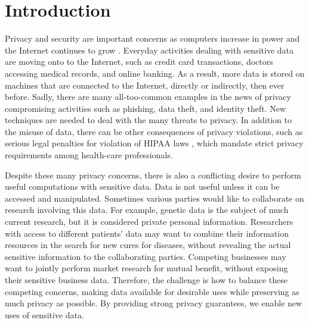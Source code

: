 
\chapter{Introduction}
\begin{quote}
%
\begin{comment}
\begin{quote}
As every man goes through life he fills in a number of forms for the
record, each containing a number of questions... There are thus hundreds
of little threads radiating from every man, millions of threads in
all. If these threads were suddenly to become visible, the whole sky
would look like a spider's web, and if they materialized as rubber
bands, buses; trams and even people would all lose the ability to
move, and the wind would be unable to carry torn-up newspapers or
autumn leaves along the streets of the city. They are not visible,
they are not material, but every man is constantly aware of their
existence.... Each man, permanently aware of his own invisible threads,
naturally develops a respect for the people who manipulate the threads.

--Alexander Solzhenitsyn, Cancer Ward, 1968.
\end{quote}

\end{comment}
{}
\end{quote}
Privacy and security are important concerns as computers increase
in power and the Internet continues to grow \cite{cra99,tur03}. Everyday
activities dealing with sensitive data are moving onto to the Internet,
such as credit card transactions, doctors accessing medical records,
and online banking. As a result, more data is stored on machines that
are connected to the Internet, directly or indirectly, then ever before.
Sadly, there are many all-too-common examples in the news of
privacy compromising activities such as phishing, data theft, and
identity theft. New techniques are needed to deal with the many threats
to privacy. In addition to the misuse of data, there can be other
consequences of privacy violations, such as serious legal penalties
for violation of HIPAA laws \cite{hippa}, which mandate strict privacy
requirements among health-care professionals.

Despite these many privacy concerns, there is also a conflicting desire
to perform useful computations with sensitive data. Data is not useful
unless it can be accessed and manipulated. Sometimes various parties
would like to collaborate on research involving this data. For
example, genetic data is the subject of much current research, but
it is considered private personal information. Researchers with access
to different patients' data may want to combine their information
resources in the search for new cures for diseases, without revealing
the actual sensitive information to the collaborating parties. Competing
businesses may want to jointly perform market research for mutual
benefit, without exposing their sensitive business data. Therefore,
the challenge
is how to balance these competing concerns, making data available
for desirable uses while preserving as much privacy as possible.  By
providing strong privacy guarantees, we enable new uses of sensitive data.

